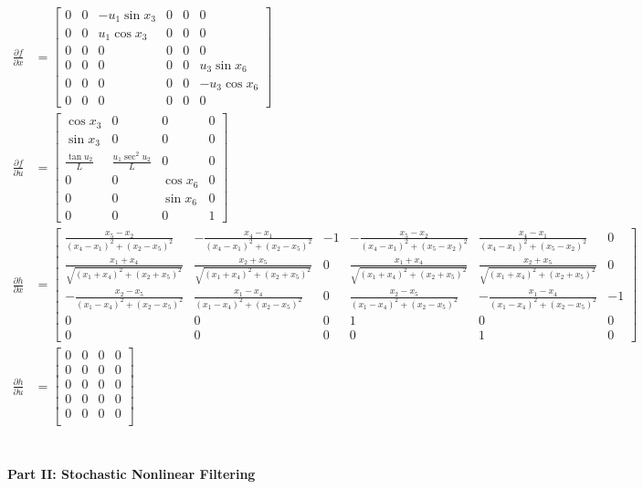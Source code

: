 \documentclass[paper=a4, fontsize=11pt]{scrartcl} %
\numberwithin{equation}{section} %
\numberwithin{figure}{section} %
\numberwithin{table}{section} %
\begin{document}
\begin{framed}
\begin{align*}
    \frac{\partial f}{\partial x} &= 
    \begin{bmatrix} 0 & 0 & -u_1\sin x_3 & 0 & 0 & 0 \\ 
                    0 & 0 & u_1\cos x_3 & 0 & 0 & 0 \\ 
                    0 & 0 & 0 & 0 & 0 & 0 \\ 
                    0 & 0 & 0 & 0 & 0 & u_3\sin x_6 \\ 
                    0 & 0 & 0 & 0 & 0 & -u_3 \cos x_6 \\ 
                    0 & 0 & 0 & 0 & 0 & 0 \end{bmatrix} \\
    \frac{\partial f}{\partial u} &= 
      \begin{bmatrix} \cos x_3 & 0 & 0 & 0 \\ 
      \sin x_3 & 0 & 0 & 0 \\ 
      \frac{\tan u_2}{L}  & \frac{u_1\sec^2u_2}{L} & 0 & 0 \\ 
       0 & 0 & \cos x_6 & 0 \\ 
       0 & 0 & \sin x_6 & 0 \\ 
       0 & 0 & 0 & 1 
       \end{bmatrix} \\
    \frac{\partial h}{\partial x} &= 
    \begin{bmatrix} \frac{x_5-x_2}{(x_4-x_1)^2+(x_2-x_5)^2} & -\frac{x_4-x_1}{(x_4-x_1)^2+(x_2-x_5)^2} & -1 & -\frac{x_5-x_2}{(x_4-x_1)^2+(x_5-x_2)^2} & \frac{x_4-x_1}{(x_4-x_1)^2+(x_5-x_2)^2} & 0 \\
    \frac{x_1+x_4}{\sqrt{(x_1+x_4)^2+(x_2+x_5)^2}} & \frac{x_2+x_5}{\sqrt{(x_1+x_4)^2+(x_2+x_5)^2}} & 0 & \frac{x_1 + x_4}{\sqrt{(x_1+x_4)^2+(x_2+x_5)^2}} & \frac{x_2+x_5}{\sqrt{(x_1+x_4)^2+(x_2+x_5)^2}} & 0 \\ 
    -\frac{x_2-x_5}{(x_1-x_4)^2+(x_2-x_5)^2} & \frac{x_1-x_4}{(x_1-x_4)^2+(x_2-x_5)^2} & 0 & \frac{x_2-x_5}{(x_1-x_4)^2+(x_2-x_5)^2} & 
    -\frac{x_1-x_4}{(x_1-x_4)^2+(x_2-x_5)^2} & -1 \\
    0 & 0 & 0 & 1 & 0 & 0 \\ 0 & 0 & 0 & 0 & 1 & 0 \end{bmatrix} \\
    \frac{\partial h}{\partial u} &= 
      \begin{bmatrix} 0 & 0 & 0 & 0  \\ 
                      0 & 0 & 0 & 0  \\ 
                      0 & 0 & 0 & 0  \\ 
                      0 & 0 & 0 & 0  \\ 
                      0 & 0 & 0 & 0  \\ 
                     \end{bmatrix} \\
\end{align*}




\end{framed}


\textbf{\\ Part II: Stochastic Nonlinear Filtering }
\begin{framed}
   
\end{framed}
\end{document}

